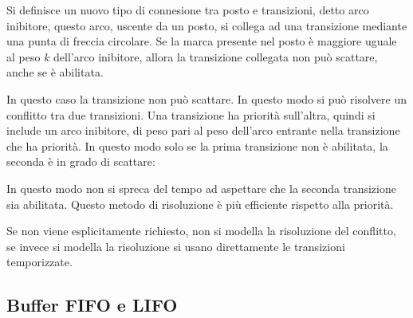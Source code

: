 \documentclass{article}
\numberwithin{equation}{subsection}
\begin{document}
Si definisce un nuovo tipo di connesione tra posto e transizioni, detto arco inibitore, questo arco, uscente da un posto, si collega ad una transizione mediante una punta di 
freccia circolare. Se la marca presente nel posto è maggiore uguale al peso $k$ dell'arco inibitore, allora la transizione collegata non può scattare, anche se è abilitata. 
\begin{center}
\end{center}
In questo caso la transizione non può scattare. In questo modo si può risolvere un conflitto tra due transizioni. Una transizione ha priorità sull'altra, quindi si include 
un arco inibitore, di peso pari al peso dell'arco entrante nella transizione che ha priorità. In questo modo solo se la prima transizione non è abilitata, la seconda è in 
grado di scattare:
\begin{center}
\end{center}
In questo modo non si spreca del tempo ad aspettare che la seconda transizione sia abilitata. Questo metodo di risoluzione è più efficiente rispetto alla priorità. 

Se non viene esplicitamente richiesto, non si modella la risoluzione del conflitto, se invece si modella la risoluzione si usano direttamente le transizioni temporizzate. 

\subsection{Buffer FIFO e LIFO}
\end{document}
